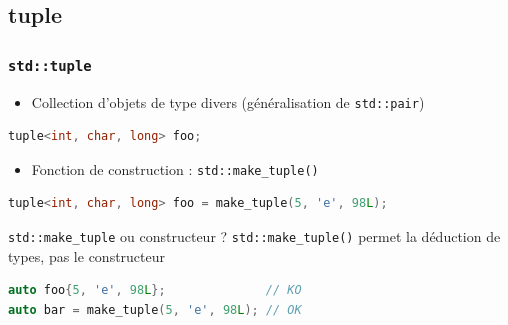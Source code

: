 \documentclass[C++.tex]{subfiles}
\begin{document}
\subsection*{tuple}
\begin{frame}[fragile]
	\frametitle{\lstinline|std::tuple|}
	\begin{itemize}
		\item Collection d'objets de type divers (généralisation de \lstinline|std::pair|)
	\end{itemize}

	\begin{lstlisting}[language=C++]
tuple<int, char, long> foo;\end{lstlisting}

	\begin{itemize}
		\item Fonction de construction : \lstinline|std::make_tuple()|
	\end{itemize}

	\begin{lstlisting}[language=C++]
tuple<int, char, long> foo = make_tuple(5, 'e', 98L);\end{lstlisting}

	\begin{block}{\lstinline|std::make_tuple| ou constructeur ?}
		\lstinline|std::make_tuple()| permet la déduction de types, pas le constructeur

		\begin{lstlisting}[language=C++]
auto foo{5, 'e', 98L};              // KO
auto bar = make_tuple(5, 'e', 98L); // OK\end{lstlisting}
	\end{block}
\end{frame}
\end{document}
